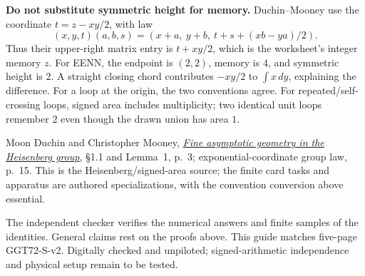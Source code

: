 \documentclass[11pt,letterpaper]{article}
\newcommand{\sectiontitle}[1]{\par\vspace{4pt}{\large\bfseries #1}\par}
\begin{document}
\textbf{Do not substitute symmetric height for memory.} Duchin--Mooney use the coordinate $t=z-xy/2$, with law
\[
(x,y,t)(a,b,s)=(x+a,\ y+b,\ t+s+(xb-ya)/2).
\]
Thus their upper-right matrix entry is $t+xy/2$, which is the worksheet's integer memory $z$. For EENN, the endpoint is $(2,2)$, memory is $4$, and symmetric height is $2$. A straight closing chord contributes $-xy/2$ to $\int x\,dy$, explaining the difference. For a loop at the origin, the two conventions agree. For repeated/self-crossing loops, signed area includes multiplicity; two identical unit loops remember $2$ even though the drawn union has area $1$.

\sectiontitle{Source and verification}
Moon Duchin and Christopher Mooney, \href{https://arxiv.org/pdf/1106.5276}{\emph{Fine asymptotic geometry in the Heisenberg group}}, \S1.1 and Lemma~1, p.~3; exponential-coordinate group law, p.~15. This is the Heisenberg/signed-area source; the finite card tasks and apparatus are authored specializations, with the convention conversion above essential.

The independent checker verifies the numerical answers and finite samples of the identities. General claims rest on the proofs above. This guide matches five-page GGT72-S-v2. Digitally checked and unpiloted; signed-arithmetic independence and physical setup remain to be tested.
\end{document}
